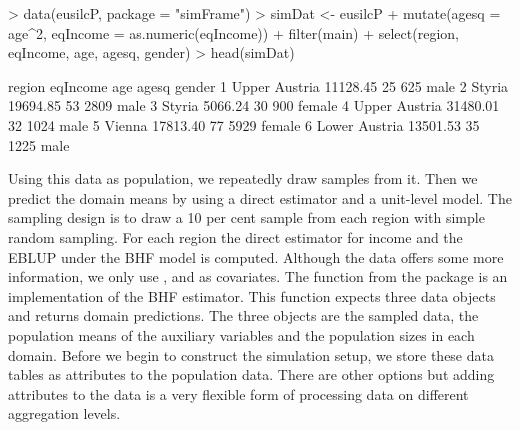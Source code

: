 \documentclass[article]{ajs}
\begin{document}
\begin{Schunk}
\begin{Sinput}
> data(eusilcP, package = "simFrame")
> simDat <- eusilcP %
+   mutate(agesq = age^2, eqIncome = as.numeric(eqIncome)) %
+   filter(main) %
+   select(region, eqIncome, age, agesq, gender)
> head(simDat)
\end{Sinput}
\begin{Soutput}
         region eqIncome age agesq gender
1 Upper Austria 11128.45  25   625   male
2        Styria 19694.85  53  2809   male
3        Styria  5066.24  30   900 female
4 Upper Austria 31480.01  32  1024   male
5        Vienna 17813.40  77  5929 female
6 Lower Austria 13501.53  35  1225   male
\end{Soutput}
\end{Schunk}

Using this data as population, we repeatedly draw samples from it. Then we predict the domain means by using a direct estimator and a unit-level model. The sampling design is to draw a 10 per cent sample from each region with simple random sampling. For each region the direct estimator for income and the EBLUP under the BHF model is computed. Although the data offers some more information, we only use ,  and  as covariates. The function  from the package  is an implementation of the BHF estimator. This function expects three data objects and returns domain predictions. The three objects are the sampled data, the population means of the auxiliary variables and the population sizes in each domain. Before we begin to construct the simulation setup, we store these data tables as attributes to the population data. There are other options but adding attributes to the data is a very flexible form of processing data on different aggregation levels.
\end{document}
